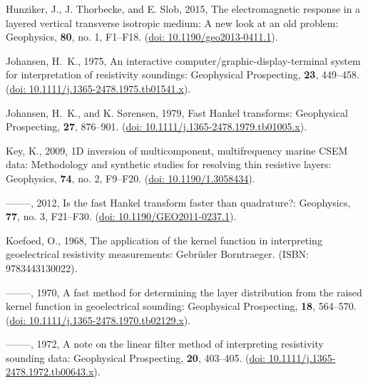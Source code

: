 \documentclass[paper,twocolumn,twoside]{geophysics}
\begin{document}
\begin{thebibliography}{}
Hunziker, J., J. Thorbecke, and E. Slob,  2015, The electromagnetic response in
  a layered vertical transverse isotropic medium: {A} new look at an old
  problem: Geophysics, {\bf 80}, no. 1, F1--F18.
\newblock (\href{http://doi.org/10.1190/geo2013-0411.1}{doi:
  10.1190/geo2013-0411.1}).

Johansen, H.~K.,  1975, An interactive computer/graphic-display-terminal system
  for interpretation of resistivity soundings: Geophysical Prospecting, {\bf
  23}, 449--458.
\newblock (\href{http://doi.org/10.1111/j.1365-2478.1975.tb01541.x}{doi:
  10.1111/j.1365-2478.1975.tb01541.x}).

Johansen, H.~K., and K. Sørensen,  1979, Fast {H}ankel transforms: Geophysical
  Prospecting, {\bf 27}, 876--901.
\newblock (\href{http://doi.org/10.1111/j.1365-2478.1979.tb01005.x}{doi:
  10.1111/j.1365-2478.1979.tb01005.x}).

Key, K.,  2009, {1D} inversion of multicomponent, multifrequency marine {CSEM}
  data: {M}ethodology and synthetic studies for resolving thin resistive
  layers: Geophysics, {\bf 74}, no. 2, F9--F20.
\newblock (\href{http://doi.org/10.1190/1.3058434}{doi: 10.1190/1.3058434}).

--------, 2012, Is the fast {H}ankel transform faster than quadrature?:
  Geophysics, {\bf 77}, no. 3, F21--F30.
\newblock (\href{http://doi.org/10.1190/GEO2011-0237.1}{doi:
  10.1190/GEO2011-0237.1}).

Koefoed, O.,  1968, The application of the kernel function in interpreting
  geoelectrical resistivity measurements: Gebrüder Borntraeger.
\newblock ({I}SBN: 9783443130022).

--------, 1970, A fast method for determining the layer distribution from the
  raised kernel function in geoelectrical sounding: Geophysical Prospecting,
  {\bf 18}, 564--570.
\newblock (\href{http://doi.org/10.1111/j.1365-2478.1970.tb02129.x}{doi:
  10.1111/j.1365-2478.1970.tb02129.x}).

--------, 1972, A note on the linear filter method of interpreting resistivity
  sounding data: Geophysical Prospecting, {\bf 20}, 403--405.
\newblock (\href{http://doi.org/10.1111/j.1365-2478.1972.tb00643.x}{doi:
  10.1111/j.1365-2478.1972.tb00643.x}).


\end{thebibliography}
\end{document}
